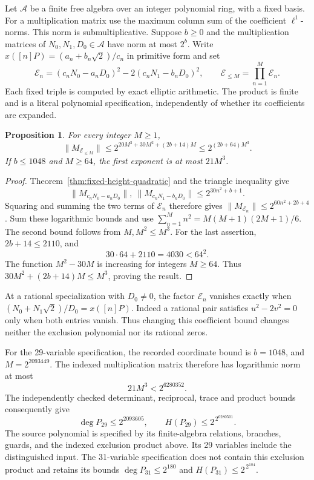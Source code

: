 \documentclass[11pt,a4paper]{article}
\newtheorem{proposition}[theorem]{Proposition}
\theoremstyle{definition}
\theoremstyle{remark}
\begin{document}
Let $\mathcal A$ be a finite free algebra over an integer polynomial
ring, with a fixed basis. For a multiplication matrix use the maximum
column sum of the coefficient $\ell^1$-norms. This norm is
submultiplicative. Suppose $b\ge0$ and the multiplication matrices of
$N_0,N_1,D_0\in\mathcal A$ have norm at most $2^b$.
Write $x([n]P)=(a_n+b_n\sqrt2)/c_n$ in primitive form and set
\[
 \mathcal E_n=(c_nN_0-a_nD_0)^2-2(c_nN_1-b_nD_0)^2,
 \qquad \mathcal E_{\le M}=\prod_{n=1}^M\mathcal E_n.
\]
Each fixed triple is computed by exact elliptic arithmetic. The product
is finite and is a literal polynomial specification, independently of
whether its coefficients are expanded.

\begin{proposition}\label{prop:fixed-height-cubic-product}
For every integer $M\ge1$,
\[
 \|M_{\mathcal E_{\le M}}\|
       \le 2^{20M^3+30M^2+(2b+14)M}
       \le 2^{(2b+64)M^3}.
\]
If $b\le1048$ and $M\ge64$, the first exponent is at most $21M^3$.
\end{proposition}
\begin{proof}
Theorem~\ref{thm:fixed-height-quadratic} and the triangle inequality give
\[
 \|M_{c_nN_0-a_nD_0}\|,\ \|M_{c_nN_1-b_nD_0}\|
       \le2^{30n^2+b+1}.
\]
Squaring and summing the two terms of $\mathcal E_n$ therefore
gives $\|M_{\mathcal E_n}\|\le2^{60n^2+2b+4}$.
Sum these logarithmic bounds and use
$\sum_{n=1}^M n^2=M(M+1)(2M+1)/6$.
The second bound follows from $M,M^2\le M^3$.
For the last assertion, $2b+14\le2110$, and
\[
                   30\cdot64+2110=4030<64^2.
\]
The function $M^2-30M$ is increasing for integers $M\ge64$.
Thus $30M^2+(2b+14)M\le M^3$, proving the result.
\end{proof}

At a rational specialization with $D_0\ne0$, the factor
$\mathcal E_n$ vanishes exactly when
$(N_0+N_1\sqrt2)/D_0=x([n]P)$. Indeed a rational pair satisfies
$u^2-2v^2=0$ only when both entries vanish. Thus changing this
coefficient bound changes neither the exclusion polynomial nor its
rational zeros.

For the 29-variable specification, the recorded coordinate bound is
$b=1048$, and $M=2^{2093449}$. The indexed multiplication matrix
therefore has logarithmic norm at most
\[
                         21M^3<2^{6280352}.
\]
The independently checked determinant, reciprocal, trace and product
bounds consequently give
\[
            \deg P_{29}\le2^{2093605},\qquad
            H(P_{29})\le2^{\,2^{6280501}}.
\]
The source polynomial is specified by its finite-algebra relations,
branches, guards, and the indexed exclusion product above. Its
29 variables include the distinguished input. The 31-variable specification
does not contain this exclusion product and retains its bounds
$\deg P_{31}\le2^{180}$ and $H(P_{31})\le2^{\,2^{184}}$.
\end{document}
